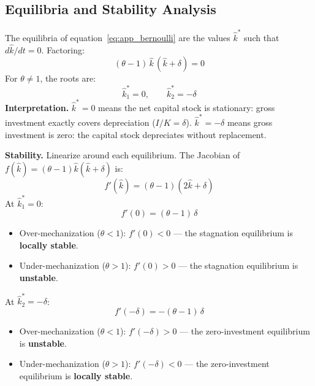 \documentclass[11pt,a4paper]{article}
\begin{document}

\subsection{Equilibria and Stability Analysis}
\label{app:stability}

The equilibria of equation~\eqref{eq:app_bernoulli} are the values $\hat{k}^*$ such that $d\hat{k}/dt = 0$. Factoring:
%
\begin{equation}\label{eq:app_equilibria}
	(\theta - 1)\,\hat{k}\,(\hat{k} + \delta) = 0
\end{equation}
%
For $\theta \neq 1$, the roots are:
%
\begin{equation}\label{eq:app_roots}
	\hat{k}_1^* = 0, \qquad \hat{k}_2^* = -\delta
\end{equation}
%
\textbf{Interpretation.} $\hat{k}^* = 0$ means the net capital stock is stationary: gross investment exactly covers depreciation ($I/K = \delta$). $\hat{k}^* = -\delta$ means gross investment is zero: the capital stock depreciates without replacement.

\textbf{Stability.} Linearize around each equilibrium. The Jacobian of $f(\hat{k}) = (\theta-1)\hat{k}(\hat{k}+\delta)$ is:
%
\begin{equation}\label{eq:app_jacobian}
	f'(\hat{k}) = (\theta - 1)(2\hat{k} + \delta)
\end{equation}
%
At $\hat{k}_1^* = 0$:
%
\begin{equation}
	f'(0) = (\theta - 1)\,\delta
\end{equation}
%
\begin{itemize}
	\item Over-mechanization ($\theta < 1$): $f'(0) < 0$ — the stagnation equilibrium is \textbf{locally stable}.
	\item Under-mechanization ($\theta > 1$): $f'(0) > 0$ — the stagnation equilibrium is \textbf{unstable}.
\end{itemize}

At $\hat{k}_2^* = -\delta$:
%
\begin{equation}
	f'(-\delta) = -(\theta - 1)\,\delta
\end{equation}
%
\begin{itemize}
	\item Over-mechanization ($\theta < 1$): $f'(-\delta) > 0$ — the zero-investment equilibrium is \textbf{unstable}.
	\item Under-mechanization ($\theta > 1$): $f'(-\delta) < 0$ — the zero-investment equilibrium is \textbf{locally stable}.
\end{itemize}
\end{document}
